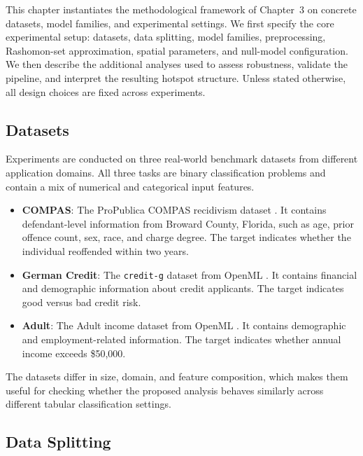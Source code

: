 This chapter instantiates the methodological framework of Chapter~3 on concrete datasets,
model families, and experimental settings. We first specify the core experimental setup:
datasets, data splitting, model families, preprocessing, Rashomon-set approximation, spatial parameters, and null-model configuration. We then describe
the additional analyses used to assess robustness, validate the pipeline, and interpret the
resulting hotspot structure. Unless stated otherwise, all design choices are fixed across
experiments.

\subsection{Datasets}

Experiments are conducted on three real-world benchmark datasets from different
application domains. All three tasks are binary classification problems and contain a mix
of numerical and categorical input features.

\begin{itemize}
    \item \textbf{COMPAS}: The ProPublica COMPAS recidivism dataset
    \citep{angwin_machine_2016, larson_how_2016}. It contains defendant-level
    information from Broward County, Florida, such as age, prior offence count, sex,
    race, and charge degree. The target indicates whether the individual reoffended
    within two years.

    \item \textbf{German Credit}: The \texttt{credit-g} dataset from OpenML
    \citep{hofmann_statlog_1994}. It contains financial and demographic information about
    credit applicants. The target indicates good versus bad credit risk.

    \item \textbf{Adult}: The Adult income dataset from OpenML \citep{becker_adult_1996}.
    It contains demographic and employment-related information. The target indicates
    whether annual income exceeds \$50{,}000.
\end{itemize}

The datasets differ in size, domain, and feature composition, which makes them useful for
checking whether the proposed analysis behaves similarly across different tabular
classification settings.

\subsection{Data Splitting}
\label{sec:exp-splits}

